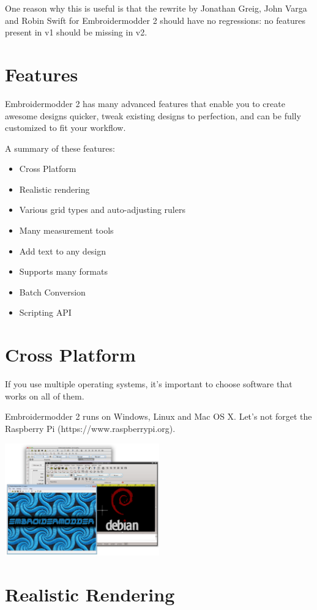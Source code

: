 \documentclass[10pt]{report}
\begin{document}
One reason why this is useful is that the rewrite by Jonathan Greig, John Varga
and Robin Swift for Embroidermodder 2 should have no regressions: no features
present in v1 should be missing in v2.

\section{Features}

Embroidermodder 2 has many advanced features that enable you to create awesome designs quicker, tweak existing designs to perfection, and can be fully customized to fit your workflow.

A summary of these features:

\begin{itemize}
\item Cross Platform
\item Realistic rendering
\item Various grid types and auto-adjusting rulers
\item Many measurement tools
\item Add text to any design
\item Supports many formats
\item Batch Conversion
\item Scripting API
\end{itemize}

\section{Cross Platform}

If you use multiple operating systems, it's important to choose software that works on all of them.

Embroidermodder 2 runs on Windows, Linux and Mac OS X. Let's not forget the  Raspberry
Pi (https://www.raspberrypi.org).

\includegraphics[width=0.5\textwidth]{images/features-platforms-1.png}

\section{Realistic Rendering}
\end{document}
